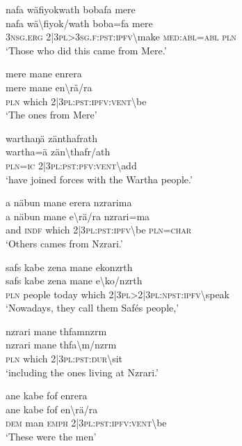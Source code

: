 \ea\label{ex:4:a1660}
nafa wäfiyokwath bobafa mere\\
\gll nafa	wä{\textbackslash}fiyok/wath	boba=fa	mere\\
     3\textsc{nsg}.\textsc{erg}	2|3\textsc{pl}>3\textsc{sg}.\textsc{f}:\textsc{pst}:\textsc{ipfv}{\textbackslash}make	\textsc{med}:\textsc{abl}=\textsc{abl}	\textsc{pln}\\
\glt `Those who did this came from Mere.'
\z

\ea\label{ex:4:a1662}
mere mane enrera\\
\gll mere	mane	en{\textbackslash}rä/ra\\
     \textsc{pln}	which	2|3\textsc{pl}:\textsc{pst}:\textsc{ipfv}:\textsc{vent}{\textbackslash}be\\
\glt `The ones from Mere'
\z

\ea\label{ex:4:a1663}
warthaŋä zänthafrath\\
\gll wartha=ä	zän{\textbackslash}thafr/ath\\
     \textsc{pln}=\textsc{ic}	2|3\textsc{pl}:\textsc{pst}:\textsc{pfv}:\textsc{vent}{\textbackslash}add\\
\glt `have joined forces with the Wartha people.'
\z

\ea\label{ex:4:a1664}
a näbun mane erera nzrarima\\
\gll a	näbun	mane	e{\textbackslash}rä/ra	nzrari=ma\\
     and	\textsc{indf}	which	2|3\textsc{pl}:\textsc{pst}:\textsc{ipfv}{\textbackslash}be	\textsc{pln}=\textsc{char}\\
\glt `Others cames from Nzrari.'
\z

\ea\label{ex:4:a1666}
safs kabe zena mane ekonzrth\\
\gll safs	kabe	zena	mane	e{\textbackslash}ko/nzrth\\
     \textsc{pln}	people	today	which	2|3\textsc{pl}>2|3\textsc{pl}:\textsc{npst}:\textsc{ipfv}{\textbackslash}speak\\
\glt `Nowadays, they call them Safés people,'
\z

\ea\label{ex:4:a1667}
nzrari mane thfamnzrm\\
\gll nzrari	mane	thfa{\textbackslash}m/nzrm\\
     \textsc{pln}	which	2|3\textsc{pl}:\textsc{pst}:\textsc{dur}{\textbackslash}sit\\
\glt `including the ones living at Nzrari.'
\z

\ea\label{ex:4:a1668}
ane kabe fof enrera\\
\gll ane	kabe	fof	en{\textbackslash}rä/ra\\
     \textsc{dem}	man	\textsc{emph}	2|3\textsc{pl}:\textsc{pst}:\textsc{ipfv}:\textsc{vent}{\textbackslash}be\\
\glt `These were the men'
\z


